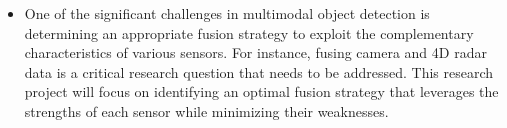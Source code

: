 \documentclass[rnd]{mas_proposal}
\begin{document}
\begin{itemize}
      \item One of the significant challenges in multimodal object detection is determining an appropriate fusion strategy to exploit the complementary characteristics of various sensors. For instance, fusing camera and 4D radar data is a critical research question that needs to be addressed. This research project will focus on identifying an optimal fusion strategy that leverages the strengths of each sensor while minimizing their weaknesses.




\end{itemize}
\end{document}
